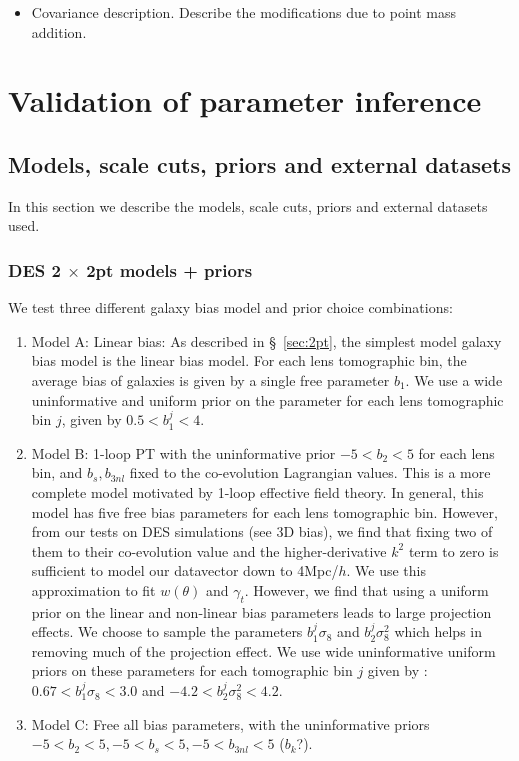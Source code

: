 \documentclass[fleqn,usenatbib]{mnras}
\begin{document}
\begin{itemize}
    \item Covariance description. Describe the modifications due to point mass addition. 
\end{itemize}

\section{Validation of parameter inference}

\subsection{Models, scale cuts, priors and external datasets}
In this section we describe the models, scale cuts, priors and external datasets used.

\subsubsection{DES 2 $\times$ 2pt models + priors}
\label{sec:2x2pt_models}
We test three different galaxy bias model and prior choice combinations:
\begin{enumerate}
    \item Model A: Linear bias: As described in \S~\ref{sec:2pt}, the simplest model galaxy bias model is the  linear bias model. For each lens tomographic bin, the average bias of galaxies is given by a single free parameter $b_1$. We use a wide uninformative and uniform prior on the parameter for each lens tomographic bin $j$, given by $0.5 < b^{j}_1 < 4$. 
    \item Model B: 1-loop PT with the uninformative prior $-5<b_2<5$ for each lens bin, and $b_s, b_{3nl}$ fixed to the co-evolution Lagrangian values. This is a more complete model motivated by 1-loop effective field theory. In general, this model has five free bias parameters for each lens tomographic bin. However, from our tests on DES simulations (see 3D bias), we find that fixing two of them to their co-evolution value and the higher-derivative $k^2$ term to zero is sufficient to model our datavector down to 4Mpc/$h$. We use this  approximation to fit $w(\theta)$ and $\gamma_t$. However, we find that using a uniform prior on the linear and non-linear bias parameters leads to large projection effects. We choose to sample the parameters $b^{j}_1 \sigma_8$ and $b^{j}_2 \sigma^2_8$ which helps in removing much of the projection effect. We use wide uninformative uniform priors on these parameters for each tomographic bin $j$ given by : $0.67 < b^{j}_1 \sigma_8 < 3.0$ and $-4.2 < b^{j}_2 \sigma^2_8 < 4.2$. 
    \item Model C: Free all bias parameters, with the uninformative priors $-5<b_2<5, -5<b_s<5, -5<b_{3nl}<5$ ($b_k$?).
\end{enumerate}
\end{document}
